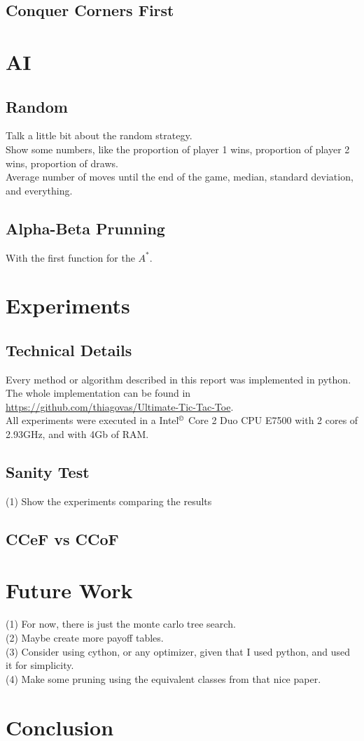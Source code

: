 \documentclass[10pt]{article}
\begin{document}
\subsection{Conquer Corners First}



\section{AI}
\subsection{Random}
Talk a little bit about the random strategy.\\
Show some numbers, like the proportion of player 1 wins, proportion of player 2 wins, proportion of draws.\\
Average number of moves until the end of the game, median, standard deviation, and everything.

\subsection{Alpha-Beta Prunning}
With the first function for the $A^*$.


\section{Experiments}
\subsection{Technical Details}
Every method or algorithm described in this report was implemented in python. The whole implementation can be found in \url{https://github.com/thiagovas/Ultimate-Tic-Tac-Toe}.\\
All experiments were executed in a Intel$^\copyright$ Core {\tiny\texttrademark} 2 Duo CPU E7500 with 2 cores of 2.93GHz, and with 4Gb of RAM.
\subsection{Sanity Test}
(1) Show the experiments comparing the results

\subsection{CCeF vs CCoF}



\section{Future Work}
(1) For now, there is just the monte carlo tree search.\\
(2) Maybe create more payoff tables.\\
(3) Consider using cython, or any optimizer, given that I used python, and used it for simplicity.\\
(4) Make some pruning using the equivalent classes from that nice paper.


\section{Conclusion}



{}

\end{document}
